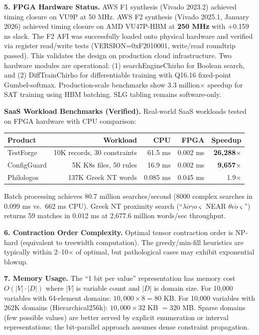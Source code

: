 \documentclass[11pt,a4paper]{article}
\begin{document}
\textbf{5. FPGA Hardware Status.}
AWS F1 synthesis (Vivado 2023.2) achieved timing closure on VU9P at 50 MHz.
AWS F2 synthesis (Vivado 2025.1, January 2026) achieved timing closure on AMD VU47P-HBM at \textbf{250 MHz} with +0.159 ns slack.
The F2 AFI was successfully loaded onto physical hardware and verified via register read/write tests (VERSION=0xF2010001, write/read roundtrip passed).
This validates the design on production cloud infrastructure.
Two hardware modules are operational: (1) searchEngineChirho for Boolean search, and (2) DiffTrainChirho for differentiable training with Q16.16 fixed-point Gumbel-softmax.
Production-scale benchmarks show 3.3 million$\times$ speedup for SAT training using HBM batching.
SLG tabling remains software-only.

\textbf{SaaS Workload Benchmarks (Verified).}
Real-world SaaS workloads tested on FPGA hardware with CPU comparison:

\begin{center}
\begin{tabular}{lrrrr}
\toprule
\textbf{Product} & \textbf{Workload} & \textbf{CPU} & \textbf{FPGA} & \textbf{Speedup} \\
\midrule
TestForge & 10K records, 30 constraints & 61.5 ms & 0.002 ms & \textbf{26,288$\times$} \\
ConfigGuard & 5K K8s files, 50 rules & 16.9 ms & 0.002 ms & \textbf{9,657$\times$} \\
Philologos & 137K Greek NT words & 0.085 ms & 0.045 ms & 1.9$\times$ \\
\bottomrule
\end{tabular}
\end{center}

Batch processing achieves 80.7 million searches/second (8000 complex searches in 0.099 ms vs.\ 662 ms CPU).
Greek NT proximity search (``$\lambda\acute{o}\gamma o\varsigma$ NEAR $\theta\epsilon\acute{o}\varsigma$'') returns 59 matches in 0.012 ms at 2,677.6 million words/sec throughput.

\textbf{6. Contraction Order Complexity.}
Optimal tensor contraction order is NP-hard (equivalent to treewidth computation).
The greedy/min-fill heuristics are typically within 2--10$\times$ of optimal, but pathological cases may exhibit exponential blowup.

\textbf{7. Memory Usage.}
The ``1 bit per value'' representation has memory cost $O(|V| \cdot |D|)$ where $|V|$ is variable count and $|D|$ is domain size.
For 10,000 variables with 64-element domains: $10{,}000 \times 8 = 80$ KB.
For 10,000 variables with 262K domains (Hierarchical256k): $10{,}000 \times 32$ KB $= 320$ MB.
Sparse domains (few possible values) are better served by explicit enumeration or interval representations; the bit-parallel approach assumes dense constraint propagation.
\end{document}
